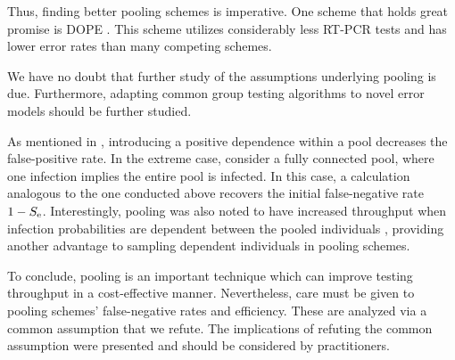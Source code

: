 \documentclass{article}
\begin{document}
Thus, finding better pooling schemes is imperative. One scheme that
holds great promise is DOPE \cite{DOPE}. This scheme utilizes
considerably less RT-PCR tests and has lower error rates than many
competing schemes.

We have no doubt that further study of the assumptions underlying
pooling is due. Furthermore, adapting common group testing algorithms
\cite{Kim} to novel error models should be further studied.





As mentioned in \cite{DorfmanYuvalDor}, introducing a positive
dependence within a pool decreases the false-positive rate. In the
extreme case, consider a fully connected pool, where one infection
implies the entire pool is infected. In this case, a calculation
analogous to the one conducted above recovers the initial
false-negative rate $1-S_\text{e}$. Interestingly, pooling was also noted to
have increased throughput when infection probabilities are dependent
between the pooled individuals \cite{DorfmanYuvalDor}, providing
another advantage to sampling dependent individuals in pooling
schemes.


To conclude, pooling is an important technique which can improve
testing throughput in a cost-effective manner. Nevertheless, care must
be given to pooling schemes' false-negative rates and
efficiency. These are analyzed via a common assumption that we refute.
The implications of refuting the common assumption were presented and
should be considered by practitioners.



\end{document}

